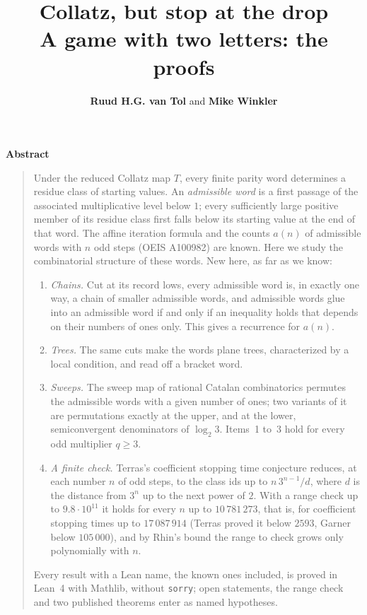 \documentclass[10pt,a4paper,titlepage]{article}
\title{\textbf{Collatz, but stop at the drop}\\[0.5ex]
  \Large A game with two letters: the proofs}
\author{\textbf{Ruud H.G. van Tol} and \textbf{Mike Winkler}}
\date{Preprint, October 2026\\[8ex]
  \begin{tikzpicture}[scale=0.9]\dropgridXXXIX
    \draw[black!45, fill=red!22] (6.25,-1.20) rectangle ++(1.25,-0.60);
    \node at (6.875,-1.500) {\small $38$};
    \draw[chordblue!70!black, line width=1pt] (0.625,-0.300) ellipse (0.36 and 0.21);
    \draw[red!65!black, line width=1pt] (6.875,-1.500) ellipse (0.36 and 0.21);
  \end{tikzpicture}\\[6ex]
  {\small \copyright\ 2026 Ruud H.G. van Tol and Mike Winkler. Licensed under \href{https://creativecommons.org/licenses/by/4.0/}{CC BY 4.0}.\\
  DOI \href{https://doi.org/10.5281/zenodo.23631547}{10.5281/zenodo.23631547}}}
\begin{document}
\maketitle

\bigskip
\begin{center}\textbf{Abstract}\end{center}
\begin{quotation}\small\noindent
Under the reduced Collatz map $T$, every finite parity word determines a residue class
of starting values. An \emph{admissible word} is a first passage of the associated
multiplicative level below $1$; every sufficiently large positive member of its residue
class first falls below its starting value at the end of that word. The affine iteration
formula and the counts $a(n)$ of admissible words with $n$ odd steps (OEIS A100982) are
known. Here we study the combinatorial structure of these words. New here, as far as we
know:

\begin{enumerate}\setlength{\itemsep}{0.3ex}
\item \emph{Chains.} Cut at its record lows, every admissible word is, in exactly one
  way, a chain of smaller admissible words, and admissible words glue into an admissible
  word if and only if an inequality holds that depends on their numbers of ones only.
  This gives a recurrence for $a(n)$.
\item \emph{Trees.} The same cuts make the words plane trees, characterized by a local
  condition, and read off a bracket word.
\item \emph{Sweeps.} The sweep map of rational Catalan combinatorics permutes the
  admissible words with a given number of ones; two variants of it are permutations exactly at the
  upper, and at the lower, semiconvergent denominators of $\log_2 3$.
  Items~1 to~3 hold for every odd multiplier $q \ge 3$.
\item \emph{A finite check.} Terras's coefficient stopping time conjecture reduces, at
  each number $n$ of odd steps, to the class ids up to $n\,3^{n-1}/d$, where $d$ is the distance from $3^n$
  up to the next power of $2$. With a range
  check up to $9.8 \cdot 10^{11}$ it holds for every $n$ up to $10\,781\,273$, that is,
  for coefficient stopping times up to $17\,087\,914$ (Terras proved it below $2593$,
  Garner below $105\,000$), and by Rhin's bound the range to check grows only polynomially with $n$.
\end{enumerate}

\noindent
Every result with a Lean name, the known ones included, is proved in Lean~4 with
Mathlib, without \texttt{sorry}; open statements, the range check and two published
theorems enter as named hypotheses.
\end{quotation}
\end{document}
